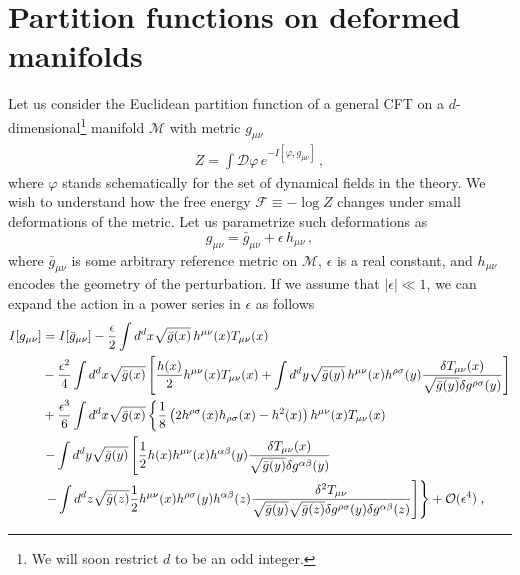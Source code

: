\documentclass[12pt]{article}
\numberwithin{equation}{section}
\begin{document}
\section{Partition functions on deformed manifolds}
\label{party}


Let us consider the Euclidean partition function of a general CFT on a $d$-dimensional\footnote{We will soon restrict $d$ to be an odd integer.} manifold $\mathcal{M}$ with metric $g_{\mu\nu}$
%
\begin{align}
	Z=\int \mathcal{D} \varphi\, e^{-I[\varphi,g_{\mu\nu}]}\, ,
\end{align}
%
where $\varphi$ stands schematically for the set of dynamical fields in the theory. We wish to understand how the free energy $\mathcal{F}\equiv-\log Z$ changes under small deformations of the metric. Let us parametrize such deformations as
%
\begin{equation}\label{pepe}
g_{\mu\nu}= \bar{g}_{\mu\nu}+\epsilon\, h_{\mu\nu}\, ,
\end{equation}
%
where $\bar{g}_{\mu\nu}$ is some arbitrary reference metric on $\mathcal{M}$, $\epsilon$ is a real constant, and $h_{\mu\nu}$ encodes the geometry of the perturbation. If we assume that $|\epsilon|\ll1$, we can expand the action in a power series in $\epsilon$ as follows 
%
\begin{align}\notag
I[g_{\mu\nu}]&=I[\bar{g}_{\mu\nu}]-\frac{\epsilon}{2} \int d^dx \sqrt{\bar g(x)} \,h^{\mu\nu}(x) T_{\mu\nu}(x)  \\ \notag &-\frac{\epsilon^2}{4} \int d^dx  \sqrt{\bar g(x)} \left[\frac{h(x)}{2}h^{\mu\nu}(x) T_{\mu\nu}(x)+  \int d^dy \sqrt{\bar g(y)} \, h^{\mu\nu}(x)h^{\rho\sigma}(y) \frac{\delta T_{\mu\nu}(x)}{\sqrt{\bar{g}(y)}\delta g^{\rho \sigma}(y)} \right]\\ \notag
&+\frac{\epsilon^3}{6}  \int d^dx  \sqrt{\bar g(x)}  \left\{\frac{1}{8}\left(2h^{\rho\sigma}(x)h_{\rho\sigma}(x)-h^2(x) \right)h^{\mu\nu}(x)T_{\mu\nu}(x) \right. \\ \notag 
&\left.- \int d^d y \sqrt{\bar{g}(y)} \left[\frac{1}{2} h(x) h^{\mu\nu}(x)h^{\alpha\beta}(y)\frac{\delta T_{\mu\nu}(x)}{\sqrt{\bar{g}(y)}\delta g^{\alpha\beta}(y)} \right. \right. \\ &\left. \left. -\int d^dz \sqrt{\bar{g}(z)}\frac{1}{2}h^{\mu\nu}(x)h^{\rho\sigma}(y) h^{\alpha\beta}(z) \frac{\delta^2 T_{\mu\nu}}{\sqrt{\bar{g}(y)}\sqrt{\bar{g}(z)}\delta g^{\rho\sigma}(y)\delta g^{\alpha\beta}(z)}\right]\right\} +\mathcal{O}(\epsilon^4)\;,
\,
\end{align}
\end{document}
